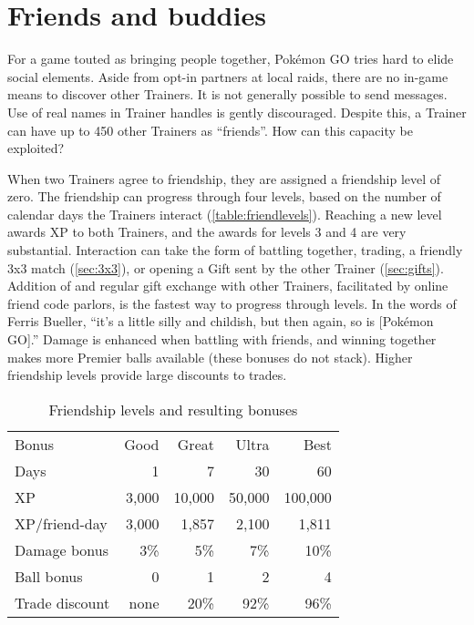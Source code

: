 \chapter{Friends and buddies}
\label{chap:friends}
For a game touted as bringing people together, Pokémon GO tries hard to elide social elements.
Aside from opt-in partners at local raids, there are no in-game means to discover other Trainers.
It is not generally possible to send messages.
Use of real names in Trainer handles is gently discouraged.
Despite this, a Trainer can have up to 450 other Trainers as ``friends''.
How can this capacity be exploited?

When two Trainers agree to friendship, they are assigned a friendship level of zero.
The friendship can progress through four levels, based on the number of calendar
  days the Trainers interact (\autoref{table:friendlevels}).
Reaching a new level awards XP to both Trainers, and the awards for levels 3 and 4 are very substantial.
Interaction can take the form of battling together, trading, a friendly 3x3 match (\autoref{sec:3x3}), or
  opening a Gift sent by the other Trainer (\autoref{sec:gifts}).
Addition of and regular gift exchange with other Trainers, facilitated by online friend code parlors,
  is the fastest way to progress through levels.
In the words of Ferris Bueller, ``it's a little silly and childish, but then again, so is [Pokémon GO].''
Damage is enhanced when battling with friends, and winning together
  makes more Premier balls available (these bonuses do not stack).
Higher friendship levels provide large discounts to trades.
\begin{table}
\centering
\begin{tabular}{lrrrr}
Bonus & Good & Great & Ultra & Best\\
\Midrule
Days & 1 & 7 & 30 & 60\\
XP  & 3,000 & 10,000 & 50,000 & 100,000\\
XP/friend-day & 3,000 & 1,857 & 2,100 & 1,811\\
Damage bonus & 3\% & 5\% & 7\% & 10\%\\
Ball bonus & 0 & 1 & 2 & 4\\
Trade discount & none & 20\% & 92\% & 96\% \\
\end{tabular}
\caption{Friendship levels and resulting bonuses}
\label{table:friendlevels}
\end{table}

